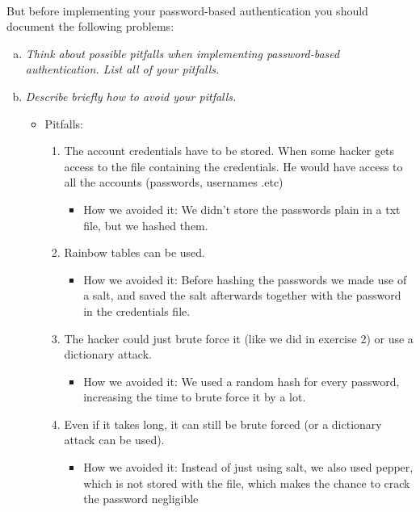 \\But before implementing your password-based authentication you should document the following problems:
\begin{enumerate}[(a)]
    \item {\itshape Think  about  possible  pitfalls  when  implementing  password-based  authentication. List all of your pitfalls.}
    \item {\itshape Describe briefly how to avoid your pitfalls.}
    
    \begin{itemize}
        \item Pitfalls: 
        \begin{enumerate}[1.]
            \item The account credentials have to be stored. When some hacker gets access to the file containing the credentials. He would have access to all the accounts (passwords, usernames .etc)
            \begin{itemize}
                \item How we avoided it: We didn't store the passwords plain in a txt file, but we hashed them.
            \end{itemize}
            
            \item Rainbow tables can be used.
            \begin{itemize}
                \item How we avoided it: Before hashing the passwords we made use of a salt, and saved the salt afterwards together with the password in the credentials file. 
            \end{itemize}
            
            \item The hacker could just brute force it (like we did in exercise 2) or use a dictionary attack.
            \begin{itemize}
                \item How we avoided it: We used a random hash for every password, increasing the time to brute force it by a lot.
            \end{itemize}
            
            \item Even if it takes long, it can still be brute forced (or a dictionary attack can be used).
            \begin{itemize}
                \item How we avoided it: Instead of just using salt, we also used pepper, which is not stored with the file, which makes the chance to crack the password negligible
            \end{itemize}
            

\end{enumerate}
\end{itemize}
\end{enumerate}
